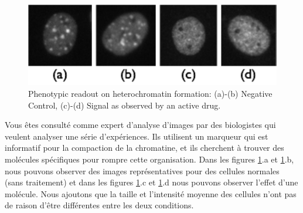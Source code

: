 \documentclass[11pt,addpoints]{exam}
\begin{document}
\begin{questions}

\begin{figure}[!ht]
\centering
\includegraphics[scale=0.8]{TSA_phenotype.pdf}
\caption{Phenotypic readout on heterochromatin formation: (a)-(b)
  Negative Control, (c)-(d) Signal as observed 
  by an active drug.}
\label{fig:tsa}
\end{figure}

\question[3] Vous êtes consulté comme expert d'analyse d'images par
des biologistes qui veulent analyser une série d'expériences. Ils
utilisent un marqueur qui est informatif pour la compaction de la
chromatine, et ils cherchent à trouver des molécules spécifiques pour
rompre cette organisation. Dans les figures \ref{fig:tsa}.a et
\ref{fig:tsa}.b, nous pouvons observer des images représentatives pour
des cellules normales (sans traitement) et dans les figures
\ref{fig:tsa}.c et \ref{fig:tsa}.d nous pouvons observer l'effet d'une
molécule. Nous ajoutons que la taille et l'intensité moyenne des
cellules n'ont pas de raison d'être différentes entre les deux
conditions. 


\end{questions}
\end{document}
